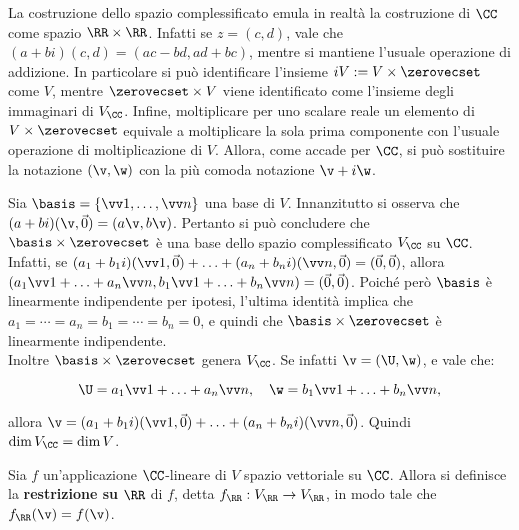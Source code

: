 \documentclass[11pt]{article}
\begin{document}
	\begin{remark}
		La costruzione dello spazio complessificato emula in realtà la costruzione di $\CC$ come spazio
		$\RR \times \RR$. Infatti se $z = (c, d)$, vale che $(a + bi)(c, d) = (ac - bd, ad + bc)$, mentre
		si mantiene l'usuale operazione di addizione. In particolare si può identificare l'insieme
		$iV := V \times \zerovecset$ come $V$, mentre $\zerovecset \times V$ viene identificato come l'insieme
		degli immaginari di $V_\CC$. Infine, moltiplicare per uno scalare reale un elemento di
		$V \times \zerovecset$ equivale a moltiplicare la sola prima componente con l'usuale operazione
		di moltiplicazione di $V$. Allora, come accade per $\CC$, si può sostituire la notazione
		$(\v, \w)$ con la più comoda notazione $\v + i \w$.
	\end{remark}

	\begin{remark}
		Sia $\basis = \{ \vv 1, \ldots, \vv n \}$ una base di $V$. Innanzitutto si osserva che
		$(a+bi)(\v, \vec 0) = (a\v, b\v)$. Pertanto si può concludere che $\basis \times \zerovecset$ è
		una base dello spazio complessificato $V_\CC$ su $\CC$. \\
		
		Infatti, se $(a_1 + b_1 i)(\vv 1, \vec 0) + \ldots + (a_n + b_n i)(\vv n, \vec 0) = (\vec 0, \vec 0)$,
		allora $(a_1 \vv 1 + \ldots + a_n \vv n, b_1 \vv 1 + \ldots + b_n \vv n) = (\vec 0, \vec 0)$.
		Poiché però $\basis$ è linearmente indipendente per ipotesi, l'ultima identità implica che
		$a_1 = \cdots = a_n = b_1 = \cdots = b_n = 0$, e quindi che $\basis \times \zerovecset$ è linearmente
		indipendente. \\
		
		Inoltre $\basis \times \zerovecset$ genera $V_\CC$. Se infatti $\v = (\U, \w)$, e vale che:
		
		\[ \U = a_1 \vv 1 + \ldots + a_n \vv n, \quad \w = b_1 \vv 1 + \ldots + b_n \vv n, \]
		
		\vskip 0.1in
		
		allora $\v = (a_1 + b_1 i) (\vv 1, \vec 0) + \ldots + (a_n + b_n i) (\vv n, \vec 0)$. Quindi
		$\dim V_\CC = \dim V$.
	\end{remark}

	\begin{definition}
		Sia $f$ un'applicazione $\CC$-lineare di $V$ spazio vettoriale su $\CC$. Allora
		si definisce la \textbf{restrizione su} $\RR$ di $f$, detta $f_\RR : V_\RR \to V_\RR$,
		in modo tale che $f_\RR(\v) = f(\v)$.
	\end{definition}
\end{document}
